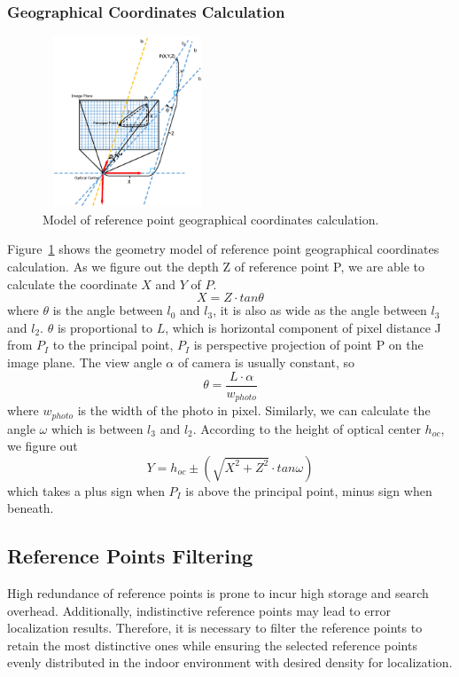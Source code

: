\documentclass[10pt, conference, letterpaper]{IEEEtran}
\begin{document}
\subsubsection{Geographical Coordinates Calculation}
\begin{figure}[!ht]
\centering
\includegraphics[width=2in, height=2in]{refgeo.eps}
\caption{Model of reference point geographical coordinates calculation.}
\label{fig_refgeo}
\end{figure}
Figure~\ref{fig_refgeo} shows the geometry model of reference point geographical coordinates calculation. As we figure out the depth Z of reference point P, we are able to calculate the coordinate $X$ and $Y$ of $P$.
\begin{equation}
    X=Z\cdot tan{\theta}
\end{equation}
where $\theta$ is the angle between $l_0$ and $l_3$, it is also as wide as the angle between $l_3$ and $l_2$. $\theta$ is proportional to $L$, which is horizontal component of pixel distance J from $P_I$ to the principal point, $P_I$ is perspective projection of point P on the image plane. The view angle $\alpha$ of camera is usually constant, so
\begin{equation}
    \theta = \frac{L\cdot \alpha}{w_{photo}}
\end{equation}
where $w_{photo}$ is the width of the photo in pixel.
Similarly, we can calculate the angle $\omega$ which is between $l_3$ and $l_2$. According to the height of optical center $h_{oc}$, we figure out
\begin{equation}
    Y=h_{oc}\pm (\sqrt{X^2+Z^2}\cdot tan{\omega} )
\end{equation}
which takes a plus sign when $P_I$ is above the principal point, minus sign when beneath.
\subsection{Reference Points Filtering}
High redundance of reference points is prone to incur high storage and search overhead. Additionally, indistinctive reference points may lead to error localization results. Therefore, it is necessary to filter the reference points to retain the most distinctive ones while ensuring the selected reference points evenly distributed in the indoor environment with desired density for localization.
\end{document}
